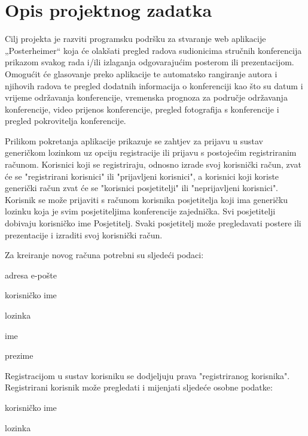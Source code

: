 \chapter{Opis projektnog zadatka}
		
		Cilj projekta je razviti programsku podršku za stvaranje web aplikacije „Posterheimer“ koja će olakšati pregled radova sudionicima stručnih konferencija prikazom svakog rada i/ili izlaganja odgovarajućim posterom ili prezentacijom. Omogućit će glasovanje preko aplikacije te automatsko rangiranje autora i njihovih radova te pregled dodatnih informacija o konferenciji kao što su datum i vrijeme održavanja konferencije, vremenska prognoza za područje održavanja konferencije, video prijenos konferencije, pregled fotografija s konferencije i pregled pokrovitelja konferencije.
		
		Prilikom pokretanja aplikacije prikazuje se zahtjev za prijavu u sustav generičkom lozinkom uz opciju registracije ili prijavu s postojećim registriranim računom.
		Korisnici koji se registriraju, odnosno izrade svoj korisnički račun, zvat će se "registrirani korisnici" ili "prijavljeni korisnici", a korisnici koji koriste generički račun zvat će se "korisnici posjetitelji" ili "neprijavljeni korisnici". Korisnik se može prijaviti s računom korisnika posjetitelja koji ima generičku lozinku koja je svim posjetiteljima konferencije zajednička. Svi posjetitelji dobivaju korisničko ime Posjetitelj. Svaki posjetitelj može pregledavati postere ili prezentacije i izraditi svoj korisnički račun.
		
		Za kreiranje novog računa potrebni su sljedeći podaci:
		\begin{packed_item}
			\item adresa e-pošte
			\item korisničko ime
			\item lozinka
			\item ime
			\item prezime
		\end{packed_item}
		
		Registracijom u sustav korisniku se dodjeljuju prava "registriranog korisnika". Registrirani korisnik može pregledati i mijenjati sljedeće osobne podatke:
		\begin{packed_item}
			\item korisničko ime
			\item lozinka
		\end{packed_item}

